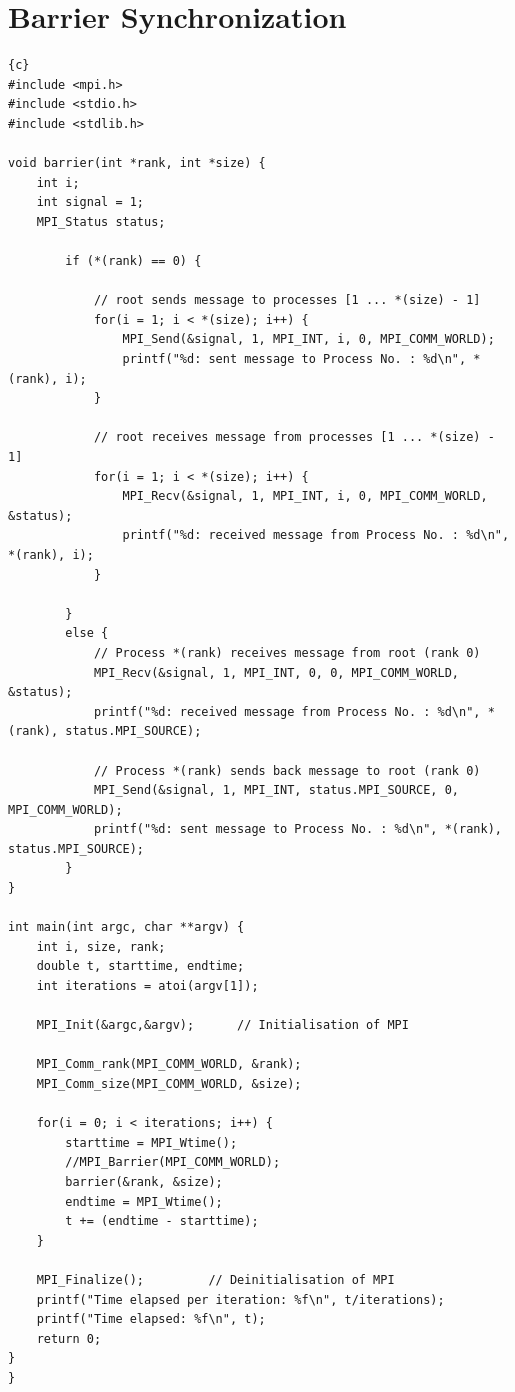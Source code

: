 \documentclass{article}
\newcommand{\enterProblemHeader}[1]{
}
\newcommand{\exitProblemHeader}[1]{
}
\newcounter{homeworkProblemCounter} %
\newcommand{\homeworkProblemName}{}
\newenvironment{homeworkProblem}[1][Problem \arabic{homeworkProblemCounter}]{ %
\stepcounter{homeworkProblemCounter} %
\renewcommand{\homeworkProblemName}{#1} %
\section{\homeworkProblemName} %
}{
}
\begin{document}
\begin{homeworkProblem}[Barrier Synchronization]

\begin{lstlisting}{c}
#include <mpi.h>
#include <stdio.h>
#include <stdlib.h>

void barrier(int *rank, int *size) {
	int i;
	int signal = 1;
	MPI_Status status;

		if (*(rank) == 0) {

			// root sends message to processes [1 ... *(size) - 1]
			for(i = 1; i < *(size); i++) {
				MPI_Send(&signal, 1, MPI_INT, i, 0, MPI_COMM_WORLD);
				printf("%d: sent message to Process No. : %d\n", *(rank), i);
			}
			
			// root receives message from processes [1 ... *(size) - 1]
			for(i = 1; i < *(size); i++) {
				MPI_Recv(&signal, 1, MPI_INT, i, 0, MPI_COMM_WORLD, &status);
				printf("%d: received message from Process No. : %d\n", *(rank), i);
			}
		
		} 
		else {
			// Process *(rank) receives message from root (rank 0)
			MPI_Recv(&signal, 1, MPI_INT, 0, 0, MPI_COMM_WORLD, &status);
			printf("%d: received message from Process No. : %d\n", *(rank), status.MPI_SOURCE);			

			// Process *(rank) sends back message to root (rank 0)
			MPI_Send(&signal, 1, MPI_INT, status.MPI_SOURCE, 0, MPI_COMM_WORLD);
			printf("%d: sent message to Process No. : %d\n", *(rank), status.MPI_SOURCE);			
		}
}

int main(int argc, char **argv) {
	int i, size, rank;
	double t, starttime, endtime;
	int iterations = atoi(argv[1]);

	MPI_Init(&argc,&argv);		// Initialisation of MPI
	
	MPI_Comm_rank(MPI_COMM_WORLD, &rank);
	MPI_Comm_size(MPI_COMM_WORLD, &size);
	
	for(i = 0; i < iterations; i++) {
		starttime = MPI_Wtime();
		//MPI_Barrier(MPI_COMM_WORLD);		
		barrier(&rank, &size);
		endtime = MPI_Wtime();
		t += (endtime - starttime);
	}

	MPI_Finalize();			// Deinitialisation of MPI
	printf("Time elapsed per iteration: %f\n", t/iterations);
	printf("Time elapsed: %f\n", t);
	return 0;
}
}
\end{lstlisting}


\end{homeworkProblem}
\end{document}
